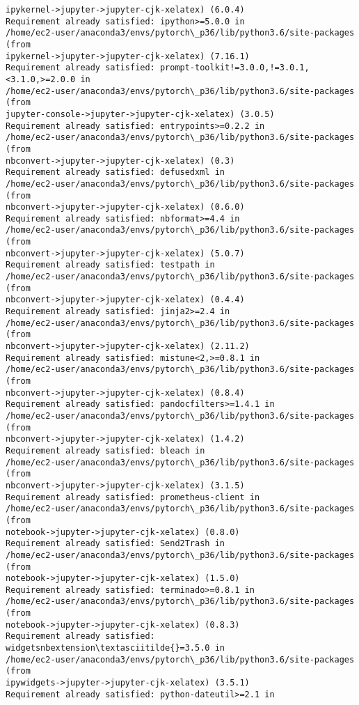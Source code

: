 \documentclass[11pt]{article}
\begin{document}
\begin{Verbatim}[commandchars=\\\{\}]
ipykernel->jupyter->jupyter-cjk-xelatex) (6.0.4)
Requirement already satisfied: ipython>=5.0.0 in
/home/ec2-user/anaconda3/envs/pytorch\_p36/lib/python3.6/site-packages (from
ipykernel->jupyter->jupyter-cjk-xelatex) (7.16.1)
Requirement already satisfied: prompt-toolkit!=3.0.0,!=3.0.1,<3.1.0,>=2.0.0 in
/home/ec2-user/anaconda3/envs/pytorch\_p36/lib/python3.6/site-packages (from
jupyter-console->jupyter->jupyter-cjk-xelatex) (3.0.5)
Requirement already satisfied: entrypoints>=0.2.2 in
/home/ec2-user/anaconda3/envs/pytorch\_p36/lib/python3.6/site-packages (from
nbconvert->jupyter->jupyter-cjk-xelatex) (0.3)
Requirement already satisfied: defusedxml in
/home/ec2-user/anaconda3/envs/pytorch\_p36/lib/python3.6/site-packages (from
nbconvert->jupyter->jupyter-cjk-xelatex) (0.6.0)
Requirement already satisfied: nbformat>=4.4 in
/home/ec2-user/anaconda3/envs/pytorch\_p36/lib/python3.6/site-packages (from
nbconvert->jupyter->jupyter-cjk-xelatex) (5.0.7)
Requirement already satisfied: testpath in
/home/ec2-user/anaconda3/envs/pytorch\_p36/lib/python3.6/site-packages (from
nbconvert->jupyter->jupyter-cjk-xelatex) (0.4.4)
Requirement already satisfied: jinja2>=2.4 in
/home/ec2-user/anaconda3/envs/pytorch\_p36/lib/python3.6/site-packages (from
nbconvert->jupyter->jupyter-cjk-xelatex) (2.11.2)
Requirement already satisfied: mistune<2,>=0.8.1 in
/home/ec2-user/anaconda3/envs/pytorch\_p36/lib/python3.6/site-packages (from
nbconvert->jupyter->jupyter-cjk-xelatex) (0.8.4)
Requirement already satisfied: pandocfilters>=1.4.1 in
/home/ec2-user/anaconda3/envs/pytorch\_p36/lib/python3.6/site-packages (from
nbconvert->jupyter->jupyter-cjk-xelatex) (1.4.2)
Requirement already satisfied: bleach in
/home/ec2-user/anaconda3/envs/pytorch\_p36/lib/python3.6/site-packages (from
nbconvert->jupyter->jupyter-cjk-xelatex) (3.1.5)
Requirement already satisfied: prometheus-client in
/home/ec2-user/anaconda3/envs/pytorch\_p36/lib/python3.6/site-packages (from
notebook->jupyter->jupyter-cjk-xelatex) (0.8.0)
Requirement already satisfied: Send2Trash in
/home/ec2-user/anaconda3/envs/pytorch\_p36/lib/python3.6/site-packages (from
notebook->jupyter->jupyter-cjk-xelatex) (1.5.0)
Requirement already satisfied: terminado>=0.8.1 in
/home/ec2-user/anaconda3/envs/pytorch\_p36/lib/python3.6/site-packages (from
notebook->jupyter->jupyter-cjk-xelatex) (0.8.3)
Requirement already satisfied: widgetsnbextension\textasciitilde{}=3.5.0 in
/home/ec2-user/anaconda3/envs/pytorch\_p36/lib/python3.6/site-packages (from
ipywidgets->jupyter->jupyter-cjk-xelatex) (3.5.1)
Requirement already satisfied: python-dateutil>=2.1 in

\end{Verbatim}
\end{document}
